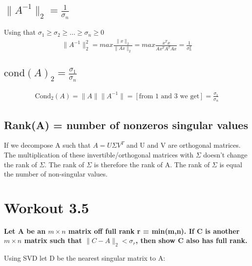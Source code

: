 \documentclass[a4paper]{article}
\begin{document}
\subsection{$\|A^{-1}\|_2 = \frac{1}{\sigma_n}$}
Using that $\sigma_1 \ge \sigma_2 \ge \ldots \ge  \sigma_n \ge 0$
\begin{equation}
	\begin{aligned}
		\|A^{-1}\|^2_2 = max \frac{\|x\|_2}{\|Ax\|_2} = max \frac{x^{T}x}{Ax^{T}A^{T}Ax} = \frac{1}{\sigma^2_n}  	
	\end{aligned}
\end{equation}

\subsection{$\text{cond}(A)_2=\frac{\sigma_1}{\sigma_n}$}

\begin{equation}
	\begin{aligned}
		\text{Cond}_2(A) = \|A\|\|A^{-1}\| = [\text{from 1 and 3 we get}] = \frac{\sigma_1}{\sigma_n}
	\end{aligned}
\end{equation}

\subsection{Rank(A) = number of nonzeros singular values}
If we decompose A such that $A= U \Sigma V^{T}$ and U and V are orthogonal matrices. The multiplication of these invertible/orthogonal matrices with $\Sigma$ doesn't change the rank of $\Sigma$. The rank of $\Sigma$ is therefore the rank of A. The rank of  $\Sigma$ is equal the number of non-singular values. 

\newpage

\section{Workout 3.5}
\textbf{Let A be an $m \times n$ matrix off full rank r = min(m,n). If C is another $m\times n$ matrix such that $\|C-A\|_2 < \sigma_r$, then show C also has full rank.}

Using SVD let D be the nearest singular matrix to A:
\end{document}

